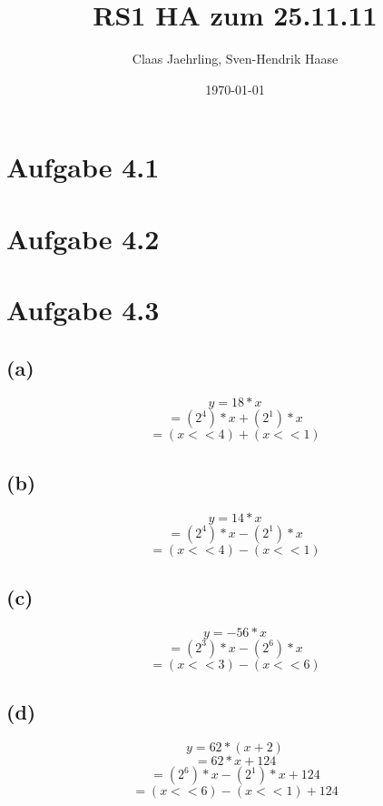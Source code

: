 \documentclass[12pt]{article}
\author{Claas Jaehrling, Sven-Hendrik Haase}
\title{RS1 HA zum 25.11.11}
\date{\today}
\begin{document}
\setcounter{secnumdepth}{0}
\maketitle

\section{Aufgabe 4.1}


\section{Aufgabe 4.2}


\section{Aufgabe 4.3}
\subsection{(a)}
\[y = 18 * x\]
\[= (2^4) * x + (2^1) * x\]
\[= (x << 4) + (x << 1)\]
\subsection{(b)}
\[y = 14 * x\]
\[= (2^4) * x - (2^1) * x\]
\[= (x << 4) - (x << 1)\]
\subsection{(c)}
\[y = -56 * x\]
\[= (2^3) * x - (2^6) * x\]
\[= (x << 3) - (x << 6)\]
\subsection{(d)}
\[y = 62 * (x + 2)\]
\[= 62 * x + 124\]
\[= (2^6) * x - (2^1) * x + 124\]
\[= (x << 6) - (x << 1) + 124\]
\end{document}

